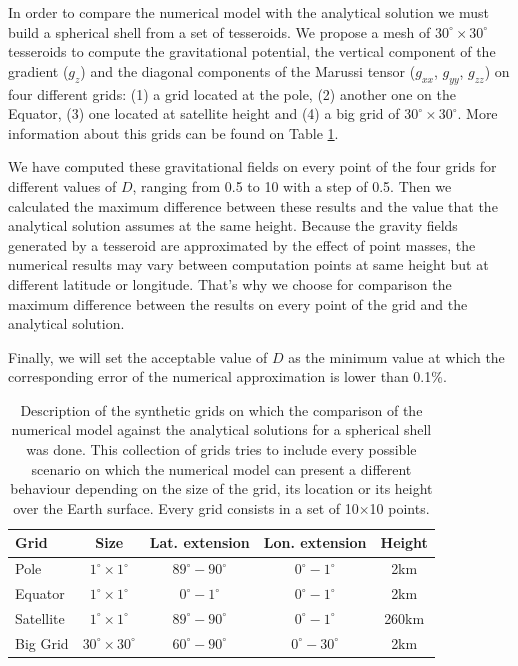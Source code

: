 \documentclass[extra]{gji}
\begin{document}
In order to compare the numerical model with the analytical solution we 
must build a spherical shell from a set of tesseroids.
We propose a mesh of $30^\circ \times 30^\circ$ tesseroids to compute 
the gravitational potential, the vertical component of the gradient 
($g_z$) and the diagonal components of the Marussi tensor ($g_{xx}$, 
$g_{yy}$, $g_{zz}$) on four different grids: (1) a grid located at the 
pole, (2) another one on the Equator, (3) one located at satellite 
height and (4) a big grid of $30^\circ \times 30^\circ$.
More information about this grids can be found on Table 
\ref{tab:grids}.

We have computed these gravitational fields on every point of the four 
grids for different values of $D$, ranging from 0.5 to 10 with a step 
of 0.5.
Then we calculated the maximum difference between these results and the 
value that the analytical solution assumes at the same height.
Because the gravity fields generated by a tesseroid are approximated by 
the effect of point masses, the numerical results may vary between 
computation points at same height but at different latitude or 
longitude.
That's why we choose for comparison the maximum difference between the 
results on every point of the grid and the analytical solution.

Finally, we will set the acceptable value of $D$ as the minimum value 
at which the corresponding error of the numerical approximation is 
lower than 0.1\%.

\begin{table}
\caption{
    Description of the synthetic grids on which the comparison of the 
    numerical model against the analytical solutions for a spherical 
    shell was done.
    This collection of grids tries to include every possible scenario 
    on which the numerical model can present a different behaviour 
    depending on the size of the grid, its location or its height over 
    the Earth surface. Every grid consists in a set of 10$\times$10 
    points.
}
\label{tab:grids}
\begin{tabular}{lcccc}
    Grid & Size & Lat. extension & Lon. extension & Height \\ \hline
    Pole & $1^\circ \times 1^\circ$ & $89^\circ - 90^\circ$ &
        $0^\circ - 1^\circ$ & 2km \\
    Equator & $1^\circ \times 1^\circ$ & $0^\circ - 1^\circ$ &
        $0^\circ - 1^\circ$ & 2km \\
    Satellite & $1^\circ \times 1^\circ$ & $89^\circ - 90^\circ$ &
        $0^\circ - 1^\circ$ & 260km \\
    Big Grid & $30^\circ \times 30^\circ$ & $60^\circ - 90^\circ$ &
        $0^\circ - 30^\circ$ & 2km \\
\end{tabular}
\end{table}
\end{document}
